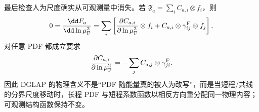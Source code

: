 \begin{derivation}[部分子分布的重整化与演化]
最后检查人为尺度确实从可观测量中消失。若
$\mathfrak F_a=\sum_i C_{a,i}\otimes f_i$，则
\begin{align*}
 0=\frac{\dd F_a}{\dd\ln\mu_{\rm F}^2}
 =\sum_i\left[
 \frac{\partial C_{a,i}}{\partial\ln\mu_{\rm F}^2}\otimes f_i
 +C_{a,i}\otimes\gamma^{\rm F}_{ij}\otimes f_j
 \right].
\end{align*}
对任意 PDF 都成立要求
\begin{equation*}
 \frac{\partial C_{a,i}}{\partial\ln\mu_{\rm F}^2}
 =-\sum_j C_{a,j}\otimes\gamma^{\rm F}_{ji}.
\end{equation*}
因此 DGLAP 的物理含义不是“PDF 随能量真的被人为改写”，而是当短程/共线的分界尺度移动时，长程 PDF 与短程系数函数以相反方向重分配同一物理内容；可观测结构函数保持不变。
\end{derivation}




